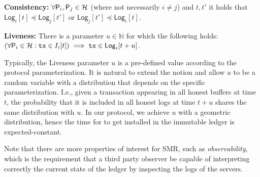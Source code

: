 \begin{cccItemize}[noitemsep]
      \item \textbf{Consistency:} $\forall \mathsf{P}_i, \mathsf{P}_j \in \mathcal{H}$ (where not necessarily $i \neq j$) and $t, t'$ it holds that $ \mathsf{Log}_i[t]  \preceq \mathsf{Log}_j [t']$ or $\mathsf{Log}_j [t'] \preceq  \mathsf{Log}_i[t]$.
      
      \item \textbf{Liveness:} There is a parameter $u\in\mathbb{N}$ for which the following holds: $(\forall \mathsf{P}_i \in \mathcal{H} : \mathtt{tx} \in I_i[t] ) \implies \mathtt{tx} \in \mathsf{Log}_i[t + u]$.
\end{cccItemize}

Typically, the Liveness parameter $u$ is a pre-defined value according to the protocol parameterization.
%
It is natural to extend the notion and allow $u$ to be a random variable with a distribution that depends on the specific parameterization.
%
I.e., given a transaction \tx appearing in all honest buffers at time $t$, the probability that it is included in all honest logs at time $t + u$ shares the same distribution with $u$.
%
In our protocol, we achieve $u$ with a geometric distribution, hence the time for \tx to get installed in the immutable ledger is expected-constant.

Note that there are more properties of interest for SMR, such as \emph{observability}, which is the requirement that a third party observer be capable of interpreting correctly the current state of the ledger by inspecting the logs of the servers.


